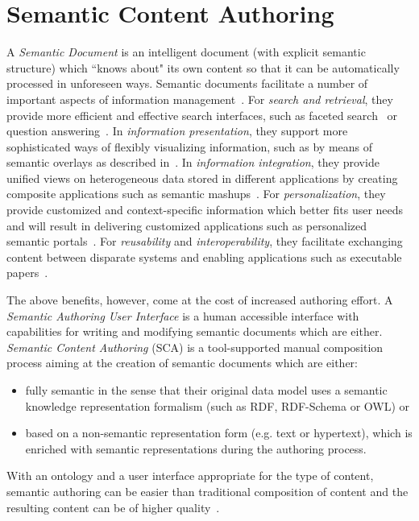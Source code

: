 \documentclass[conference]{IEEEtran}
\begin{document}
\section{Semantic Content Authoring}
\label{sec:sca}
 A \emph{Semantic Document} is an intelligent document (with explicit semantic structure) which ``knows about" its own content so that it can be automatically processed in unforeseen ways.
Semantic documents facilitate a number of important aspects of information management~\cite{rdface}.
For \emph{search and retrieval}, they provide more efficient and effective search interfaces, such as faceted search~\cite{tunkenlang2009faceted} or question answering~\cite{Lopez2011}.
In \emph{information presentation}, they support more sophisticated ways of flexibly visualizing information, such as by means of semantic overlays as described in~\cite{Burel2009}.
In \emph{information integration}, they provide unified views on heterogeneous data stored in different applications by creating composite applications such as semantic mashups~\cite{Ankolekar2007}.
For \emph{personalization}, they provide customized and context-specific information which better fits user needs and will
result in delivering customized applications such as personalized semantic portals~\cite{ecs2007}.
For \emph{reusability} and \emph{interoperability}, they facilitate exchanging content between disparate systems and enabling applications such as executable papers~\cite{Muller2011}.


The above benefits, however, come at the cost of increased authoring effort. %
A \emph{Semantic Authoring User Interface} is a human accessible interface with capabilities for writing and modifying semantic documents which are either.
\emph{Semantic Content Authoring} (SCA) is a tool-supported manual composition process aiming at the creation of semantic documents which are either:
\begin{itemize}
	\item fully semantic in the sense that their original data model uses a semantic knowledge representation formalism (such as RDF, RDF-Schema or OWL) or
	\item based on a non-semantic representation form (e.g. text or hypertext), which is enriched with semantic representations during the authoring process.\\
\end{itemize}

With an ontology and a user interface appropriate for the type of content, semantic authoring can be easier than traditional composition of content and the resulting content can be of higher quality~\cite{hasida2007}.
\end{document}
